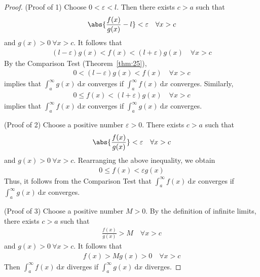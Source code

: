 \documentclass[thmcnt=section, 12pt]{elegantbook}
\begin{document}
\begin{proof}
    (Proof of 1) Choose $0 < \varepsilon < l$. Then there exists $c > a$ such that 
    \begin{align*}
        \abs{\frac{f(x)}{g(x)} - l} < \varepsilon
        \quad \forall x > c
    \end{align*}
    and $g(x) > 0 \ \forall x > c$. It follows that 
    \begin{align*}
        (l - \varepsilon) g(x) < f(x) < (l + \varepsilon) g(x)
        \quad \forall x > c
    \end{align*}
    By the Comparison Test (Theorem~\ref{thm:25}), 
    \begin{align*}
        0 < (l - \varepsilon) g(x) < f(x)
        \quad \forall x > c
    \end{align*}
    implies that $\int_a^\infty g(x) \ \mathrm{d}x$ converges if $\int_a^\infty f(x) \ \mathrm{d}x$ converges. Similarly,
    \begin{align*}
        0 \leq f(x) < (l + \varepsilon) g(x)
        \quad \forall x > c
    \end{align*}
    implies that $\int_a^\infty f(x) \ \mathrm{d}x$ converges if $\int_a^\infty g(x) \ \mathrm{d}x$ converges.

    \par (Proof of 2) Choose a positive number $\varepsilon > 0$. There exists $c > a$ such that 
    \begin{align*}
        \abs{\frac{f(x)}{g(x)}} < \varepsilon
        \quad \forall x > c
    \end{align*}
    and $g(x) > 0 \ \forall x > c$. Rearranging the above inequality, we obtain
    \begin{align*}
        0 \leq f(x) <  \varepsilon g(x)
    \end{align*}
    Thus, it follows from the Comparison Test that $\int_a^\infty f(x) \ \mathrm{d}x$ converges if $\int_a^\infty g(x) \ \mathrm{d}x$ converges. 

    \par (Proof of 3) Choose a positive number $M > 0$. By the definition of infinite limits, there exists $c > a$ such that 
    \begin{align*}
        \frac{f(x)}{g(x)} > M
        \quad \forall x > c
    \end{align*}
    and $g(x) > 0 \ \forall x > c$. It follows that 
    \begin{align*}
        f(x) > M g(x) > 0
        \quad \forall x > c
    \end{align*}
    Then $\int_a^\infty f(x) \ \mathrm{d}x$ diverges if $\int_a^\infty g(x) \ \mathrm{d}x$ diverges.
\end{proof}
\end{document}
